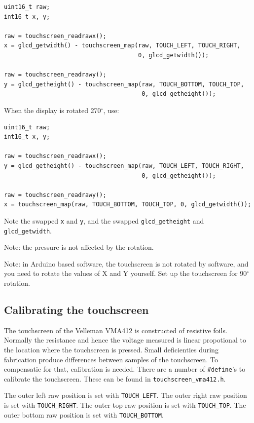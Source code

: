 \documentclass[12pt]{article}
\begin{document}
\begin{lstlisting}
uint16_t raw;
int16_t x, y;

raw = touchscreen_readrawx();
x = glcd_getwidth() - touchscreen_map(raw, TOUCH_LEFT, TOUCH_RIGHT,
                                      0, glcd_getwidth());

raw = touchscreen_readrawy();
y = glcd_getheight() - touchscreen_map(raw, TOUCH_BOTTOM, TOUCH_TOP,
                                       0, glcd_getheight());
\end{lstlisting}

When the display is rotated 270$^\circ$, use:

\begin{lstlisting}
uint16_t raw;
int16_t x, y;

raw = touchscreen_readrawx();
y = glcd_getheight() - touchscreen_map(raw, TOUCH_LEFT, TOUCH_RIGHT,
                                       0, glcd_getheight());

raw = touchscreen_readrawy();
x = touchscreen_map(raw, TOUCH_BOTTOM, TOUCH_TOP, 0, glcd_getwidth());
\end{lstlisting}

Note the swapped \lstinline|x| and \lstinline|y|, and the swapped \lstinline|glcd_getheight| and \lstinline|glcd_getwidth|.

Note: the pressure is not affected by the rotation.

Note: in Arduino based software, the touchscreen is not rotated by software, and you need to rotate the values of X and Y yourself. Set up the touchscreen for 90$^\circ$ rotation.

\subsection{Calibrating the touchscreen}
\label{sec:calibrating}
The touchscreen of the Velleman VMA412 is constructed of resistive foils. Normally the resistance and hence the voltage measured is linear propotional to the location where the touchscreen is pressed. Small deficienties during fabrication produce differences between samples of the touchscreen. To compensatie for that, calibration is needed. There are a number of \lstinline|#define|'s to calibrate the touchscreen. These can be found in \lstinline|touchscreen_vma412.h|.

The outer left raw position is set with \lstinline|TOUCH_LEFT|. The outer right raw position is set with \lstinline|TOUCH_RIGHT|. The outer top raw position is set with \lstinline|TOUCH_TOP|. The outer bottom raw position is set with \lstinline|TOUCH_BOTTOM|.
\end{document}
